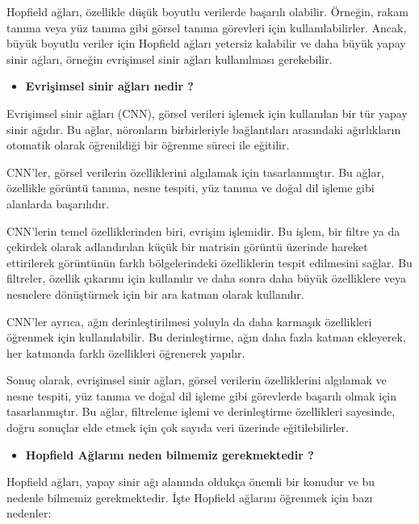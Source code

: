 \documentclass[11pt]{article}
\begin{document}
Hopfield ağları, özellikle düşük boyutlu verilerde başarılı olabilir. Örneğin, rakam tanıma veya yüz tanıma gibi görsel tanıma görevleri için kullanılabilirler. Ancak, büyük boyutlu veriler için Hopfield ağları yetersiz kalabilir ve daha büyük yapay sinir ağları, örneğin evrişimsel sinir ağları kullanılması gerekebilir.

\begin{itemize}
    \item \textbf{ Evrişimsel sinir ağları nedir ?}
\end{itemize}

Evrişimsel sinir ağları (CNN), görsel verileri işlemek için kullanılan bir tür yapay sinir ağıdır. Bu ağlar, nöronların birbirleriyle bağlantıları arasındaki ağırlıkların otomatik olarak öğrenildiği bir öğrenme süreci ile eğitilir.

CNN'ler, görsel verilerin özelliklerini algılamak için tasarlanmıştır. Bu ağlar, özellikle görüntü tanıma, nesne tespiti, yüz tanıma ve doğal dil işleme gibi alanlarda başarılıdır.

CNN'lerin temel özelliklerinden biri, evrişim işlemidir. Bu işlem, bir filtre ya da çekirdek olarak adlandırılan küçük bir matrisin görüntü üzerinde hareket ettirilerek görüntünün farklı bölgelerindeki özelliklerin tespit edilmesini sağlar. Bu filtreler, özellik çıkarımı için kullanılır ve daha sonra daha büyük özelliklere veya nesnelere dönüştürmek için bir ara katman olarak kullanılır.

CNN'ler ayrıca, ağın derinleştirilmesi yoluyla da daha karmaşık özellikleri öğrenmek için kullanılabilir. Bu derinleştirme, ağın daha fazla katman ekleyerek, her katmanda farklı özellikleri öğrenerek yapılır.

Sonuç olarak, evrişimsel sinir ağları, görsel verilerin özelliklerini algılamak ve nesne tespiti, yüz tanıma ve doğal dil işleme gibi görevlerde başarılı olmak için tasarlanmıştır. Bu ağlar, filtreleme işlemi ve derinleştirme özellikleri sayesinde, doğru sonuçlar elde etmek için çok sayıda veri üzerinde eğitilebilirler.

\begin{itemize}
    \item \textbf{Hopfield Ağlarını neden bilmemiz gerekmektedir ?}
\end{itemize}

Hopfield ağları, yapay sinir ağı alanında oldukça önemli bir konudur ve bu nedenle bilmemiz gerekmektedir. İşte Hopfield ağlarını öğrenmek için bazı nedenler:
\end{document}
